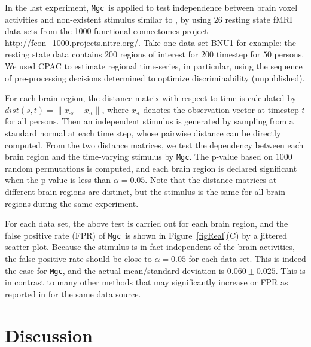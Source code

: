 \documentclass[11pt]{article}
\newcommand{\note}[2][]{\added[#1,remark={#2}]{}}
\providecommand{\sct}[1]{{\sc \texttt{#1}}}
\newcommand{\Mgc}{\sct{Mgc}}
\newcommand{\jovo}[1]{{\note{jv: #1}}}
\newcommand{\cs}[1]{{\note{cs: #1}}}
\begin{document}
In the last experiment, \Mgc~is applied to test independence between brain voxel activities and non-existent stimulus similar to \cite{EklundKnutsson2012}, by using $26$ resting state fMRI data sets from the 1000 functional connectomes project \url{http://fcon_1000.projects.nitrc.org/}. Take one data set BNU1 for example: the resting state data contains $200$ regions of interest for $200$ timestep for $50$ persons. We used CPAC\cs{cite CPAC} to estimate regional time-series, in particular, using the sequence of pre-processing decisions determined to optimize discriminability (unpublished).

For each brain region, the distance matrix with respect to time is calculated by $dist(s,t)=\|x_{\cdot s}-x_{\cdot t}\|$, where $x_{\cdot t}$ denotes the observation vector at timestep $t$ for all persons. Then an independent stimulus is generated by sampling from a standard normal at each time step, whose pairwise distance can be directly computed. From the two distance matrices, we test the dependency between each brain region and the time-varying stimulus by \Mgc. The p-value based on $1000$ random permutations is computed, and each brain region is declared significant when the p-value is less than $\alpha=0.05$. Note that the distance matrices at different brain regions are distinct, but the stimulus is the same for all brain regions during the same experiment.

For each data set, the above test is carried out for each brain region, and the false positive rate (FPR) of \Mgc~is shown in Figure~\ref{figReal}(C) by a jittered scatter plot. %
\jovo{fix after fixing fig}\cs{fixed} Because the stimulus is in fact independent of the brain activities, the false positive rate should be close to $\alpha=0.05$ for each data set. This is indeed the case for \Mgc, and the actual mean/standard deviation is $0.060 \pm 0.025$. This is in contrast to many other methods that may significantly increase or FPR as reported in \cite{EklundKnutsson2012} for the same data source.

\section{Discussion}
\label{conclu}
\end{document}
